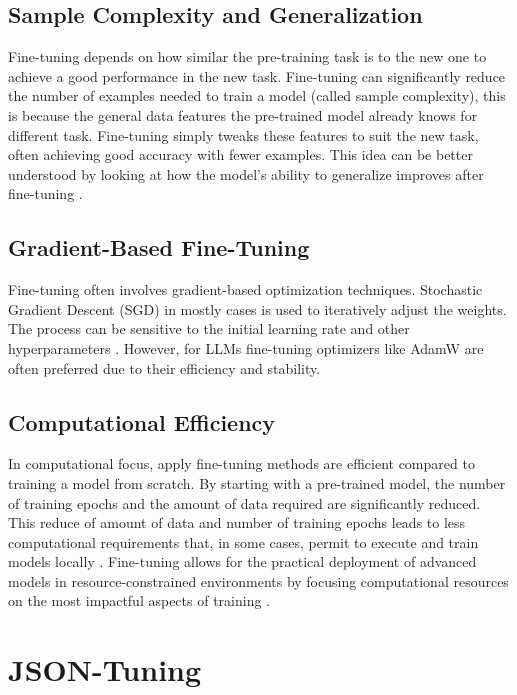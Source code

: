 \subsection{Sample Complexity and Generalization}
Fine-tuning depends on how similar the pre-training task is to the new one to achieve a good performance in the new task. Fine-tuning can significantly reduce the number of examples needed to train a model (called sample complexity), this is because the general data features the pre-trained model already knows for different task. Fine-tuning simply tweaks these features to suit the new task, often achieving good accuracy with fewer examples. This idea can be better understood by looking at how the model's ability to generalize improves after fine-tuning \citep{Shachaf2021A}.

\subsection{Gradient-Based Fine-Tuning}
Fine-tuning often involves gradient-based optimization techniques. Stochastic Gradient Descent (SGD) in mostly cases is used to iteratively adjust the weights. The process can be sensitive to the initial learning rate and other hyperparameters \citep{Vrbancic2020Transfer}. However, for LLMs fine-tuning optimizers like AdamW \citep{loshchilov2019decoupledweightdecayregularization} are often preferred due to their efficiency and stability.

\subsection{Computational Efficiency}
In computational focus, apply fine-tuning methods are efficient compared to training a model from scratch. By starting with a pre-trained model, the number of training epochs and the amount of data required are significantly reduced. This reduce of amount of data and number of training epochs leads to less computational requirements that, in some cases, permit to execute and train models locally \citep{Shi2023Towards}. Fine-tuning allows for the practical deployment of advanced models in resource-constrained environments by focusing computational resources on the most impactful aspects of training \citep{Xiao2023Offsite-Tuning:}.

\section{JSON-Tuning}

